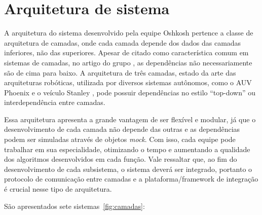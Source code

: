 \section{Arquitetura de sistema}

A arquitetura do sistema desenvolvido pela equipe Oshkosh pertence a classe de
arquitetura de camadas, onde cada camada depende dos dados das camadas
inferiores, não das superiores. Apesar de citado como característica comum
em sistemas de camadas, no artigo do grupo \citep{chen2009terramax}, as
dependências não necessariamente são de cima para baixo. A arquitetura de três
camadas, estado da arte das arquiteturas robóticas, utilizada por diversos
sistemas autônomos, como o AUV Phoenix \citep{gat1991reliable} e o veículo
Stanley \citep{montemerlo2006winning}, pode possuir dependências no estilo
``top-down'' ou interdependência entre camadas.

Essa arquitetura apresenta a grande vantagem de ser flexível e
modular, já que o desenvolvimento de cada camada não depende das outras e as
dependências podem ser simuladas através de objetos \textit{mock}. Com isso,
cada equipe pode trabalhar em sua especialidade, otimizando o tempo e
aumentando a qualidade dos algoritmos desenvolvidos em cada função. Vale
ressaltar que, ao fim do desenvolvimento de cada subsistema, o sistema deverá
ser integrado, portanto o protocolo de comunicação entre camadas e a
plataforma/framework de integração é crucial nesse tipo de arquitetura.

São apresentados sete sistemas~\ref{fig:camadas}: 

